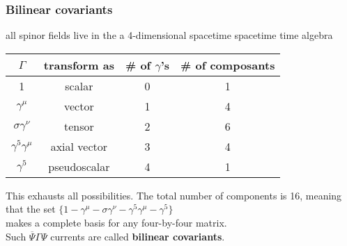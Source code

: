 \label{theoremCode}
\begin{frame}\frametitle{Bilinear covariants}
all spinor fields live in the a 4-dimensional spacetime 
spacetime time algebra

\begin{center}
\begin{tabular}{|c|c|c|c|}\hline
\textbf{$\Gamma$} & \textbf{transform as} & \textbf{\# of $\gamma$'s} & \textbf{\# of composants}\\\hline
1 & scalar & 0 & 1 \\\hline
$\gamma^\mu$ & vector & 1 & 4\\\hline
$\sigma \gamma^\nu$ & tensor & 2 & 6\\\hline
$\gamma^5 \gamma^\mu$ & axial vector & 3 & 4\\\hline
$\gamma^5$ & pseudoscalar & 4 & 1\\\hline
\end{tabular}
\end{center}
This exhausts all possibilities. The total number of components is 16, meaning that the set $\{ 1-\gamma^\mu-\sigma \gamma^\nu-\gamma^5 \gamma^\mu-\gamma^5\}$
\\ makes a complete basis for any four-by-four
matrix.\\Such $\overline{\Psi} \Gamma\Psi$ currents are called \textbf{bilinear covariants}.

\end{frame}
